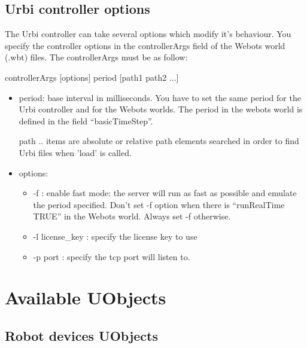 \subsection{Urbi controller options}
\label{webots.own.controlleroptions}%

 The Urbi controller can take several options which modify it's behaviour.
You specify the controller options in the controllerArgs field of the Webots
world (.wbt) files.
 The controllerArgs must be as follow:

\begin{shell}
controllerArgs [options] period [path1 path2 ...]
\end{shell}
\begin{itemize}

\item period: base \urbi interval in milliseconds. You have to set the
  same period for the Urbi controller and for the Webots worlds. The
  period in the webots world is defined in the field ``basicTimeStep''.


\item [path ..] items are absolute or relative path elements searched
  in order to find Urbi files when 'load' is called.


\item options:
  \begin{itemize}

  \item -{}f : enable fast mode: the server will run as fast as
    possible and emulate the period specified.  Don't set -{}f option
    when there is ``runRealTime TRUE'' in the Webots world.  Always set
    -{}f otherwise.


  \item -{}l license\_key : specify the license key to use


  \item -{}p port : specify the tcp port \urbi will listen to.

  \end{itemize}

\end{itemize}



\section{Available UObjects}
\label{webots.uobjects}%

\subsection{Robot devices UObjects}
\label{webots.uobjects.robotdevices}%

